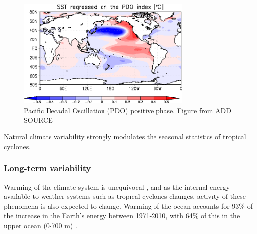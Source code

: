 \begin{figure}[h]
	\centering
	\noindent\includegraphics[width=20pc,angle=0]{pdo_pattern.png}
	\caption{Pacific Decadal Oscillation (PDO) positive phase. Figure from ADD SOURCE }\label{fig:PDO}
\end{figure}






Natural climate variability strongly modulates the seasonal statistics of tropical cyclones. 


\subsubsection{Long-term variability}

Warming of the climate system is unequivocal \citep{stocker2013ipccb}, and as the internal energy available to weather systems such as tropical cyclones changes, activity of these phenomena is also expected to change. Warming of the ocean accounts for 93\% of the increase in the Earth's energy between 1971-2010, with 64\% of this in the upper ocean (0-700 m) \citep{rhein2013chapter}.

